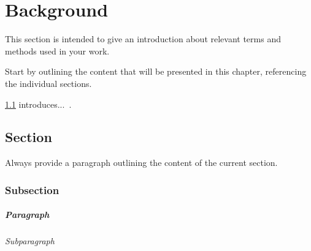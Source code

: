 \chapter{Background}
\label{cha:background}

This section is intended to give an introduction about relevant terms and methods used in your work.


Start by outlining the content that will be presented in this chapter, referencing the individual sections. 


\cref{sec:section1} introduces...~\cite{grafberger2025mlidea, ovcharenko2025crossmodalerrordetectiontables}.

\section{Section}
\label{sec:section1}
Always provide a paragraph outlining the content of the current section. 

\subsection{Subsection}

\paragraph{Paragraph}

\subparagraph{Subparagraph}